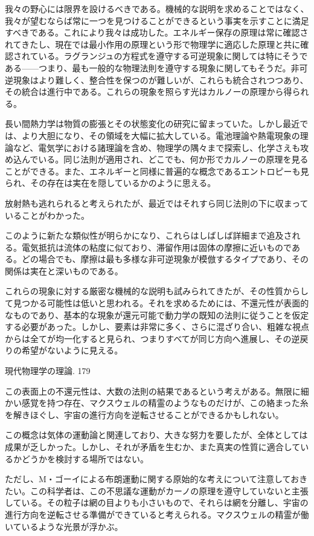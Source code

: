 \documentclass[a4paper,11pt,openany]{ltjsbook}
\begin{document}
我々の野心には限界を設けるべきである。機械的な説明を求めることではなく、我々が望むならば常に一つを見つけることができるという事実を示すことに満足すべきである。これにより我々は成功した。エネルギー保存の原理は常に確認されてきたし、現在では最小作用の原理という形で物理学に適応した原理と共に確認されている。ラグランジュの方程式を遵守する可逆現象に関しては特にそうである——つまり、最も一般的な物理法則を遵守する現象に関してもそうだ。非可逆現象はより難しく、整合性を保つのが難しいが、これらも統合されつつあり、その統合は進行中である。これらの現象を照らす光はカルノーの原理から得られる。

長い間熱力学は物質の膨張とその状態変化の研究に留まっていた。しかし最近では、より大胆になり、その領域を大幅に拡大している。電池理論や熱電現象の理論など、電気学における諸理論を含め、物理学の隅々まで探索し、化学さえも攻め込んでいる。同じ法則が適用され、どこでも、何か形でカルノーの原理を見ることができる。また、エネルギーと同様に普遍的な概念であるエントロピーも見られ、その存在は実在を隠しているかのように思える。

放射熱も逃れられると考えられたが、最近ではそれすら同じ法則の下に収まっていることがわかった。

このように新たな類似性が明らかになり、これらはしばしば詳細まで追及される。電気抵抗は流体の粘度に似ており、滞留作用は固体の摩擦に近いものである。どの場合でも、摩擦は最も多様な非可逆現象が模倣するタイプであり、その関係は実在と深いものである。

これらの現象に対する厳密な機械的な説明も試みられてきたが、その性質からして見つかる可能性は低いと思われる。それを求めるためには、不還元性が表面的なものであり、基本的な現象が還元可能で動力学の既知の法則に従うことを仮定する必要があった。しかし、要素は非常に多く、さらに混ざり合い、粗雑な視点からは全てが均一化すると見られ、つまりすべてが同じ方向へ進展し、その逆戻りの希望がないように見える。

現代物理学の理論. 179

この表面上の不還元性は、大数の法則の結果であるという考えがある。無限に細かい感覚を持つ存在、マクスウェルの精霊のようなものだけが、この絡まった糸を解きほぐし、宇宙の進行方向を逆転させることができるかもしれない。

この概念は気体の運動論と関連しており、大きな努力を要したが、全体としては成果が乏しかった。しかし、それが矛盾を生むか、また真実の性質に適合しているかどうかを検討する場所ではない。

ただし、M・ゴーイによる布朗運動に関する原始的な考えについて注意しておきたい。この科学者は、この不思議な運動がカーノの原理を遵守していないと主張している。その粒子は網の目よりも小さいもので、それらは網を分離し、宇宙の進行方向を逆転させる準備ができていると考えられる。マクスウェルの精霊が働いているような光景が浮かぶ。
\end{document}
